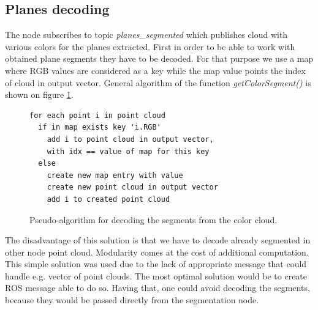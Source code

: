 \documentclass[fontsize=12pt]{article}
\begin{document}
\subsection{Planes decoding}
The node subscribes to topic \emph{planes\_segmented} which publishes cloud with various colors for the planes extracted. First in order to be able to work with obtained plane segments they have to be decoded. For that purpose we use a map where RGB values are considered as a key while the map value points the index of cloud in output vector. General algorithm of the function \emph{getColorSegment()} is shown on figure \ref{code:algo}.\\

\begin{figure}[H]
\begin{center}
\begin{lstlisting}
for each point i in point cloud
  if in map exists key 'i.RGB'
    add i to point cloud in output vector,
    with idx == value of map for this key
  else
    create new map entry with value
    create new point cloud in output vector
    add i to created point cloud
\end{lstlisting}
\caption{Pseudo-algorithm for decoding the segments from the color cloud.}
\label{code:algo}
\end{center}
\end{figure}

The disadvantage of this solution is that we have to decode already segmented in other node point cloud. Modularity comes at the cost of additional computation. This simple solution was used due to the lack of appropriate message that could handle e.g. vector of point clouds. The most optimal solution would be to create ROS message able to do so. Having that, one could avoid decoding the segments, because they would be passed directly from the segmentation node.
\end{document}
